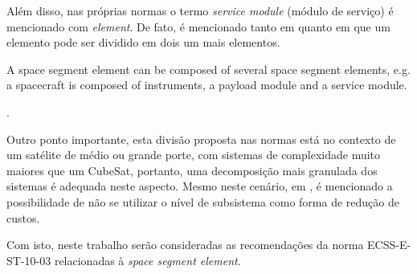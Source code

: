 Além disso, nas próprias normas o termo \textit{service module} (módulo de serviço) é mencionado com \textit{element}. De fato, é mencionado tanto em \textcite{ecss-s-st-00-01} quanto em \textcite{ecss-e-st-10-03} que um elemento pode ser dividido em dois um mais elementos.

\begin{citacao}
    A space segment element can be composed of several space segment elements, e.g. a spacecraft is composed of instruments, a payload module and a service module. \cite[p. 10]{ecss-s-st-00-01}
\end{citacao}.

Outro ponto importante, esta divisão proposta nas normas está no contexto de um satélite de médio ou grande porte, com sistemas de complexidade muito maiores que um CubeSat, portanto, uma decomposição mais granulada dos sistemas é adequada neste aspecto.
Mesmo neste cenário, em \textcite{ecss-e-hb-10-02}, é mencionado a possibilidade de não se utilizar o nível de subsistema como forma de redução de custos.

Com isto, neste trabalho serão consideradas as recomendações da norma ECSS-E-ST-10-03 \cite{ecss-e-st-10-03} relacionadas à \textit{space segment element}.




